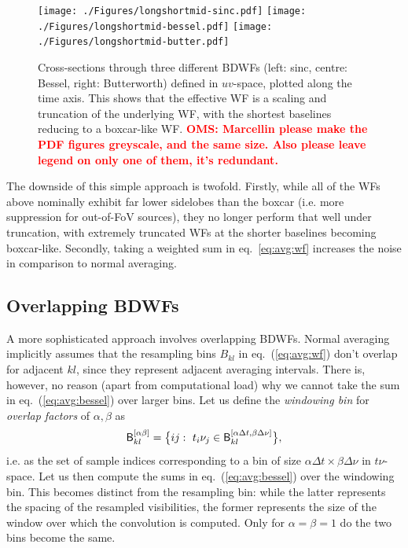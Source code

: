 \documentclass[useAMS,usenatbib]{mn2e}
\newcommand{\OMS}[1]{\textcolor{red}{{\bf OMS: #1}}}
\begin{document}
\begin{figure}%
\texttt{[image: ./Figures/longshortmid-sinc.pdf]}\hfill%
\texttt{[image: ./Figures/longshortmid-bessel.pdf]}\hfill%
\texttt{[image: ./Figures/longshortmid-butter.pdf]}
\caption{Cross-sections through three different BDWFs (left: sinc, centre: Bessel, right: Butterworth) defined in $uv$-space, 
plotted along the time axis. This shows that the effective WF is a scaling and truncation of the underlying WF, with
the shortest baselines reducing to a boxcar-like WF. \OMS{Marcellin please make the PDF figures greyscale, and the same size.
Also please leave legend on only one of them, it's redundant.}}
\label{fig:WF:perbaseline}
\end{figure}

The downside of this simple approach is twofold. Firstly, while all of the WFs above nominally exhibit far lower 
sidelobes than the boxcar
(i.e. more suppression for out-of-FoV sources), they no longer perform that well under truncation, with extremely truncated WFs 
at the shorter baselines becoming boxcar-like. Secondly, taking a weighted sum in eq.~\ref{eq:avg:wf} increases 
the noise in comparison to normal averaging.

\subsection{Overlapping BDWFs}
\label{baseline2}

A more sophisticated approach involves overlapping BDWFs. Normal averaging implicitly assumes that the resampling bins $B_{kl}$ 
in eq.~(\ref{eq:avg:wf}) don't overlap for adjacent $kl$, since they represent adjacent averaging intervals. 
There is, however, no reason (apart from computational load) why we cannot take the sum in eq.~(\ref{eq:avg:bessel}) 
over larger bins. Let us define the \emph{windowing bin} for \emph{overlap factors} of $\alpha,\beta$ as
\begin{equation}
\mathsf{B}^{[\alpha\beta]}_{kl} = \big \{ ij:~t_i\nu_j \in \mathsf{B}^{[\alpha\Delta t,\beta\Delta\nu]}_{kl} \big \},
\end{equation}
i.e. as the set of sample indices corresponding to a bin of size $\alpha\Delta t\times\beta\Delta \nu$ in $t\nu$-space.
Let us then compute the sums in eq.~(\ref{eq:avg:bessel}) over the windowing bin. This becomes distinct from the
resampling bin: while the latter represents the spacing of the resampled visibilities, the former represents the size 
of the window over which the convolution is computed. Only for $\alpha=\beta=1$ do the two bins become the same.
\end{document}
